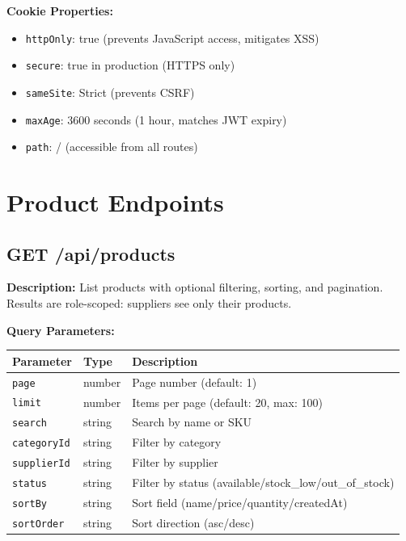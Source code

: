 \documentclass[12pt,a4paper]{report}
\begin{document}
\textbf{Cookie Properties:}
\begin{itemize}[leftmargin=1.5em]
  \item \texttt{httpOnly}: true (prevents JavaScript access, mitigates XSS)
  \item \texttt{secure}: true in production (HTTPS only)
  \item \texttt{sameSite}: Strict (prevents CSRF)
  \item \texttt{maxAge}: 3600 seconds (1 hour, matches JWT expiry)
  \item \texttt{path}: / (accessible from all routes)
\end{itemize}

\section{Product Endpoints}

\subsection{GET /api/products}

\textbf{Description:} List products with optional filtering, sorting, and pagination. Results are role-scoped: suppliers see only their products.

\textbf{Query Parameters:}
\begin{center}
\begin{tabularx}{\textwidth}{llX}
  \toprule
  \textbf{Parameter} & \textbf{Type} & \textbf{Description} \\
  \midrule
  \texttt{page}       & number  & Page number (default: 1) \\
  \texttt{limit}      & number  & Items per page (default: 20, max: 100) \\
  \texttt{search}     & string  & Search by name or SKU \\
  \texttt{categoryId} & string  & Filter by category \\
  \texttt{supplierId} & string  & Filter by supplier \\
  \texttt{status}     & string  & Filter by status (available/stock\_low/out\_of\_stock) \\
  \texttt{sortBy}     & string  & Sort field (name/price/quantity/createdAt) \\
  \texttt{sortOrder}  & string  & Sort direction (asc/desc) \\
  \bottomrule
\end{tabularx}
\end{center}
\end{document}
